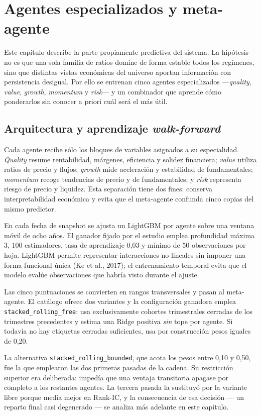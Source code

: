 \chapter{Agentes especializados y meta-agente}
\label{chap:agentes}

Este capítulo describe la parte propiamente predictiva del sistema. La hipótesis no es que una sola
familia de ratios domine de forma estable todos los regímenes, sino que distintas vistas económicas
del universo aportan información con persistencia desigual. Por ello se entrenan cinco agentes
especializados ---\textit{quality}, \textit{value}, \textit{growth}, \textit{momentum} y
\textit{risk}--- y un combinador que aprende cómo ponderarlos sin conocer a priori cuál será el
más útil.

\section{Arquitectura y aprendizaje \textit{walk-forward}}

Cada agente recibe sólo los bloques de variables asignados a su especialidad. \textit{Quality}
resume rentabilidad, márgenes, eficiencia y solidez financiera; \textit{value} utiliza ratios de
precio y flujos; \textit{growth} mide aceleración y estabilidad de fundamentales; \textit{momentum}
recoge tendencias de precio y de fundamentales; y \textit{risk} representa riesgo de precio y
liquidez. Esta separación tiene dos fines: conserva interpretabilidad económica y evita que el
meta-agente confunda cinco copias del mismo predictor.

En cada fecha de snapshot se ajusta un LightGBM por agente sobre una ventana móvil de ocho años.
El ganador fijado por el estudio emplea profundidad máxima 3, 100 estimadores, tasa de aprendizaje
0,03 y mínimo de 50 observaciones por hoja. LightGBM permite representar interacciones no lineales
sin imponer una forma funcional única (Ke et al., 2017); el entrenamiento temporal evita
que el modelo evalúe observaciones que habría visto durante el ajuste.

Las cinco puntuaciones se convierten en rangos transversales y pasan al meta-agente. El catálogo
ofrece dos variantes y la configuración ganadora emplea \texttt{stacked\_rolling\_free}: usa
exclusivamente cohortes trimestrales cerradas de los trimestres precedentes y estima una Ridge
positiva \emph{sin} tope por agente. Si todavía no hay etiquetas cerradas suficientes, usa por
construcción pesos iguales de 0,20.

La alternativa \texttt{stacked\_rolling\_bounded}, que acota los pesos entre 0,10 y 0,50, fue la que
emplearon las dos primeras pasadas de la cadena. Su restricción superior era deliberada: impedía que
una ventaja transitoria apagase por completo a los restantes agentes. La tercera pasada la sustituyó
por la variante libre porque medía mejor en Rank-IC, y la consecuencia de esa decisión --- un
reparto final casi degenerado --- se analiza más adelante en este capítulo.

